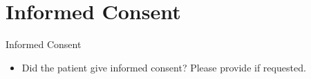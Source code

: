 \section{Informed Consent}
\begin{frame}{Informed Consent}
    \begin{itemize}
        \item Did the patient give informed consent? Please provide if requested.
    
    
    \end{itemize}
\end{frame}
